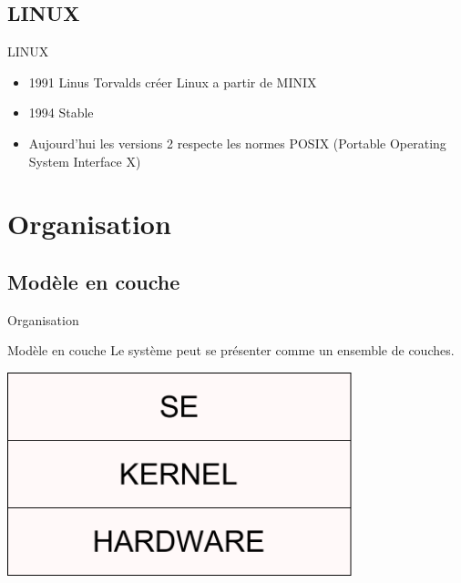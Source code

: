 \def\subsectitle{LINUX}
\subsection{\subsectitle}

\begin{frame}{\sectitle}
\begin{block}{\subsectitle}
\begin{itemize}
\item 1991 Linus Torvalds créer Linux a partir de MINIX
\item 1994 Stable
\item Aujourd'hui les versions 2 respecte les normes POSIX (Portable Operating System Interface X)
\end{itemize}
\end{block}
\end{frame}




\def\sectitle{Organisation}
\section{\sectitle}
\def\subsectitle{Modèle en couche}
\subsection{\subsectitle}

\begin{frame}{\sectitle}
\begin{block}{\subsectitle}
Le système peut se présenter comme un ensemble de couches.
\end{block}

\begin{center}
\includegraphics[width=0.75\textwidth]{images/Couches.pdf}
\end{center}

\end{frame}

